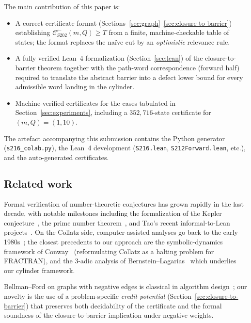 \documentclass[11pt,a4paper]{article}
\theoremstyle{plain}
\theoremstyle{definition}
\theoremstyle{plain}
\newcommand{\Calphax}{\mathcal{C}^{\leftarrow}_{S202}}
\begin{document}
\medskip

The main contribution of this paper is:

\begin{itemize}
\item A correct certificate format (Sections~\ref{sec:graph}--\ref{sec:closure-to-barrier})
      establishing $\Calphax(m, Q) \ge T$ from a finite, machine-checkable
      table of states; the format replaces the naïve cut by an
      \emph{optimistic} relevance rule.
\item A fully verified Lean~4 formalization (Section~\ref{sec:lean}) of
      the closure-to-barrier theorem together with the path-word
      correspondence (forward half) required to translate the abstract
      barrier into a defect lower bound for every admissible word
      landing in the cylinder.
\item Machine-verified certificates for the cases tabulated in
      Section~\ref{sec:experiments}, including a $352{,}716$-state
      certificate for $(m, Q) = (1, 10)$.
\end{itemize}

The artefact accompanying this submission contains the Python
generator (\texttt{s216\_colab.py}), the Lean~4 development
(\texttt{S216.lean}, \texttt{S212Forward.lean}, etc.), and the
auto-generated certificates.

\subsection*{Related work}\label{sec:related}
Formal verification of number-theoretic conjectures has grown rapidly
in the last decade, with notable milestones including the
formalization of the Kepler conjecture~\cite{flyspeck},
the prime number theorem~\cite{eberl-paulson}, and
Tao's recent informal-to-Lean projects~\cite{tao-blueprint}.
On the Collatz side, computer-assisted analyses go back to the early
1980s~\cite{lagarias1985}; the closest precedents to our approach
are the symbolic-dynamics framework of Conway~\cite{conway1972}
(reformulating Collatz as a halting problem for FRACTRAN), and the
3-adic analysis of Bernstein--Lagarias~\cite{bernstein-lagarias} which
underlies our cylinder framework.

Bellman--Ford on graphs with negative edges is classical in algorithm
design~\cite{cormen}; our novelty is the use of a problem-specific
\emph{credit potential} (Section~\ref{sec:closure-to-barrier}) that
preserves both decidability of the certificate and the formal
soundness of the closure-to-barrier implication under negative
weights.
\end{document}
